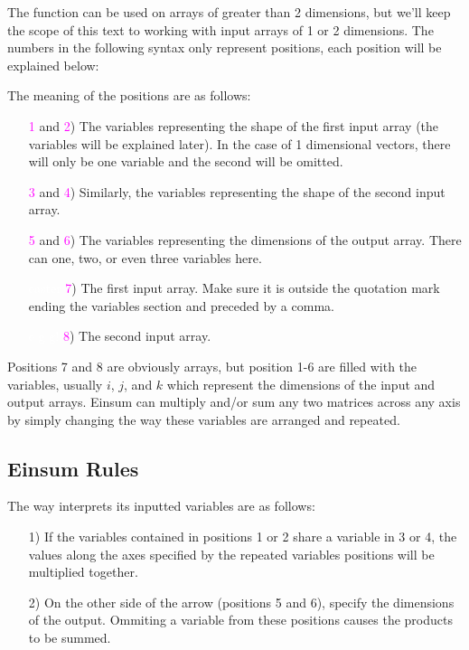 The  function can be used on arrays of greater than 2 dimensions, but we'll keep the scope of this text to working with input arrays of 1 or 2 dimensions. The numbers in the following syntax only represent positions, each position will be explained below:

\begin{center}
\end{center}

The meaning of the positions are as follows:

\begin{enumerate}
\item[\textcolor{magenta}{1} and \textcolor{magenta}{2})] The variables representing the shape of the first input array (the variables will be explained later). In the case of 1 dimensional vectors, there will only be one variable and the second will be omitted.
\item[\textcolor{magenta}{3} and \textcolor{magenta}{4})] Similarly, the variables representing the shape of the second input array.
\item[\textcolor{magenta}{5} and \textcolor{magenta}{6})] The variables representing the dimensions of the output array. There can one, two, or even three variables here.
\item[\textcolor{white}{easter} \textcolor{magenta}{7})] The first input array. Make sure it is outside the quotation mark ending the variables section and preceded by a comma.
\item[\textcolor{white}{e g g!} \textcolor{magenta}{8})] The second input array.
\end{enumerate}

Positions 7 and 8 are obviously arrays, but position 1-6 are filled with the variables, usually $i$, $j$, and $k$ which represent the dimensions of the input and output arrays. Einsum can multiply and/or sum any two matrices across any axis by simply changing the way these variables are arranged and repeated.

\subsection*{Einsum Rules}

The way  interprets its inputted variables are as follows:

\begin{enumerate}
\item[1)] If the variables contained in positions 1 or 2 share a variable in 3 or 4, the values along the axes specified by the repeated variables positions will be multiplied together.\\

\item[2)] On the other side of the arrow (positions 5 and 6), specify the dimensions of the output. Ommiting a variable from these positions causes the products to be summed.
\end{enumerate}

